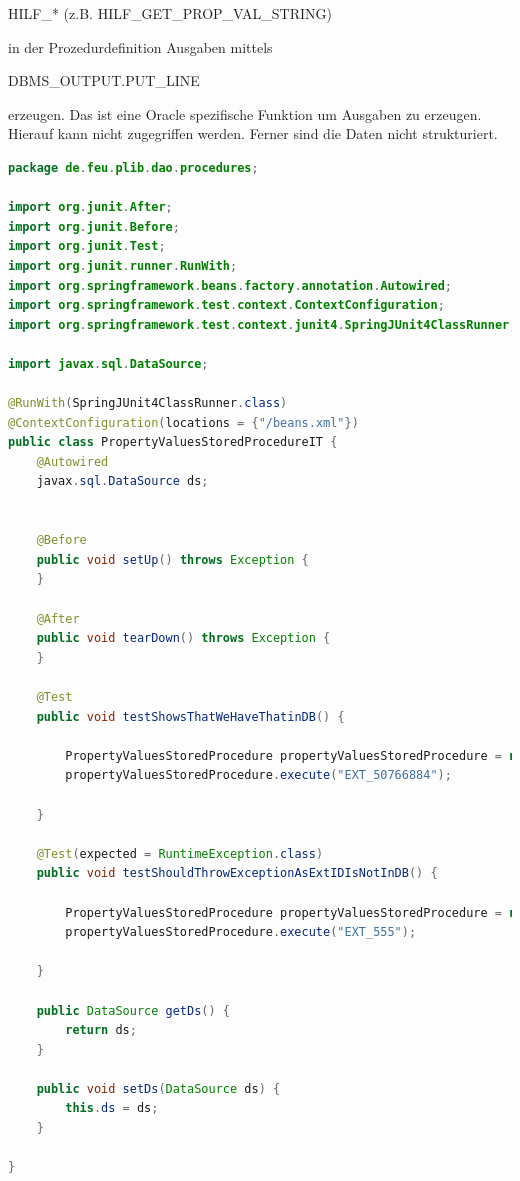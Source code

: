 HILF\_* (z.B. HILF\_GET\_PROP\_VAL\_STRING) 

in der Prozedurdefinition Ausgaben mittels 

DBMS\_OUTPUT.PUT\_LINE 

erzeugen. Das ist eine Oracle spezifische Funktion um Ausgaben zu erzeugen. Hierauf kann nicht zugegriffen werden. Ferner sind die Daten nicht strukturiert.   

\begin{lstlisting}[caption=Spring Data Oracle - Testklasse zum Aufruf der Hilfsprozeduren, language=java, label=lst:spring_data_hilf_test]
package de.feu.plib.dao.procedures;

import org.junit.After;
import org.junit.Before;
import org.junit.Test;
import org.junit.runner.RunWith;
import org.springframework.beans.factory.annotation.Autowired;
import org.springframework.test.context.ContextConfiguration;
import org.springframework.test.context.junit4.SpringJUnit4ClassRunner;

import javax.sql.DataSource;

@RunWith(SpringJUnit4ClassRunner.class)
@ContextConfiguration(locations = {"/beans.xml"})
public class PropertyValuesStoredProcedureIT {
    @Autowired
    javax.sql.DataSource ds;


    @Before
    public void setUp() throws Exception {
    }

    @After
    public void tearDown() throws Exception {
    }

    @Test
    public void testShowsThatWeHaveThatinDB() {

        PropertyValuesStoredProcedure propertyValuesStoredProcedure = new PropertyValuesStoredProcedure(ds);
        propertyValuesStoredProcedure.execute("EXT_50766884");

    }

    @Test(expected = RuntimeException.class)
    public void testShouldThrowExceptionAsExtIDIsNotInDB() {

        PropertyValuesStoredProcedure propertyValuesStoredProcedure = new PropertyValuesStoredProcedure(ds);
        propertyValuesStoredProcedure.execute("EXT_555");

    }

    public DataSource getDs() {
        return ds;
    }

    public void setDs(DataSource ds) {
        this.ds = ds;
    }

}

\end{lstlisting}



